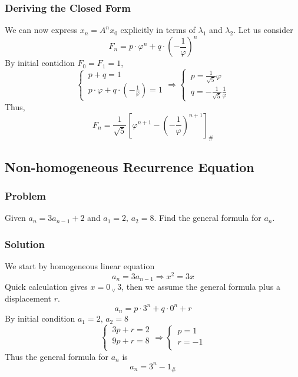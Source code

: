 \documentclass[11pt]{article}
\begin{document}
\subsubsection{Deriving the Closed Form}
We can now express $x_n = A^n x_0$ explicitly in terms of $\lambda_1$ and $\lambda_2$. Let us consider
\[
    F_n=p\cdot\varphi^n + q\cdot(-\frac{1}{\varphi})^n
\]
By initial contidion $F_0=F_1=1$, 
\[
    \begin{cases}
        \displaystyle
        \,p+q=1\\
        \displaystyle
        \,p\cdot\varphi + q\cdot (-\frac{1}{\varphi}) = 1
    \end{cases}
    \Rightarrow
    \begin{cases}
        \displaystyle
        \,p=\frac{1}{\sqrt{5}}\varphi\\
        \displaystyle
        \,q=-\frac{1}{\sqrt{5}}\frac{1}{\varphi}
    \end{cases}
\]
Thus, 
\[
    F_n = \frac{1}{\sqrt{5}}\left[\varphi^{n+1} - (-\frac{1}{\varphi})^{n+1}\right] _\#
\]
\subsection{Non-homogeneous Recurrence Equation}
\subsubsection{Problem}
Given $a_n=3a_{n-1}+2$  and $a_1 = 2,\,a_2 = 8$. Find the general formula for $a_n$. 
\subsubsection*{Solution}
We start by  homogeneous linear equation
\[
    a_n=3a_{n-1}\Rightarrow x^2=3x
\]
Quick calculation gives $\displaystyle x=0 \,_\lor \,3$, then we assume the general formula plus a displacement $r$.
\[
    a_n=p\cdot 3^n + q\cdot 0^n + r
\]
By initial condition $a_1 = 2,\, a_2 = 8$
\[
    \begin{cases}
        \displaystyle
        \,3p+r=2\\
        \displaystyle
        \,9p+r=8\\
    \end{cases}
    \Rightarrow
    \begin{cases}
        \displaystyle
        \,p=1\\
        \displaystyle
        \,r=-1\\
    \end{cases}
\]
Thus the general formula for $a_n$ is 
\[
    a_n = 3^n - 1 _\#
\]
\end{document}
